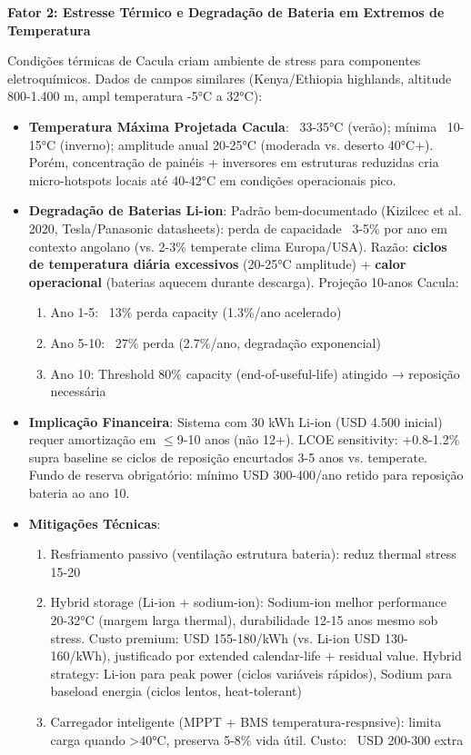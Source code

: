 \documentclass[12pt, a4paper]{article}
\begin{document}
\textbf{Fator 2: Estresse Térmico e Degradação de Bateria em Extremos de Temperatura}

Condições térmicas de Cacula criam ambiente de stress para componentes eletroquímicos. Dados de campos similares (Kenya/Ethiopia highlands, altitude 800-1.400 m, ampl temperatura -5°C a 32°C):

\begin{itemize}
\item \textbf{Temperatura Máxima Projetada Cacula}: ~33-35°C (verão); mínima ~10-15°C (inverno); amplitude anual 20-25°C (moderada vs. deserto 40°C+). Porém, concentração  de painéis + inversores em estruturas reduzidas cria micro-hotspots locais até 40-42°C em condições operacionais pico.
\item 
\textbf{Degradação de Baterias Li-ion}: Padrão bem-documentado (Kizilcec et al. 2020, Tesla/Panasonic datasheets): perda de capacidade ~3-5\% por ano em contexto angolano (vs. 2-3\% temperate clima Europa/USA). Razão: 
\textbf{ciclos de temperatura diária excessivos} (20-25°C amplitude) + 
\textbf{calor operacional} (baterias aquecem durante descarga). Projeção 10-anos Cacula:
  \begin{enumerate}
  \item Ano 1-5: ~13\% perda capacity (1.3\%/ano acelerado)
  \item Ano 5-10: ~27\% perda (2.7\%/ano, degradação exponencial)
  \item Ano 10: Threshold 80\% capacity (end-of-useful-life) atingido → reposição necessária
  \end{enumerate}
\item \textbf{Implicação Financeira}: Sistema com 30 kWh Li-ion (USD 4.500 inicial) requer amortização em $\leq$9-10 anos (não 12+). LCOE sensitivity: +0.8-1.2\% supra baseline se ciclos de reposição encurtados 3-5 anos vs. temperate. Fundo de reserva obrigatório: mínimo USD 300-400/ano retido para reposição bateria ao ano 10.
\item \textbf{Mitigações Técnicas}:
  \begin{enumerate}
  \item Resfriamento passivo (ventilação estrutura bateria): reduz thermal stress 15-20%
  \item Hybrid storage (Li-ion + sodium-ion): Sodium-ion melhor performance 20-32°C (margem larga thermal), durabilidade 12-15 anos mesmo sob stress. Custo premium: USD 155-180/kWh (vs. Li-ion USD 130-160/kWh), justificado por extended calendar-life + residual value. Hybrid strategy: Li-ion para peak power (ciclos variáveis rápidos), Sodium para baseload energia (ciclos lentos, heat-tolerant)
  \item Carregador inteligente (MPPT + BMS temperatura-respnsive): limita carga quando >40°C, preserva 5-8\% vida útil. Custo: ~USD 200-300 extra
  \end{enumerate}
\end{itemize}
\end{document}
